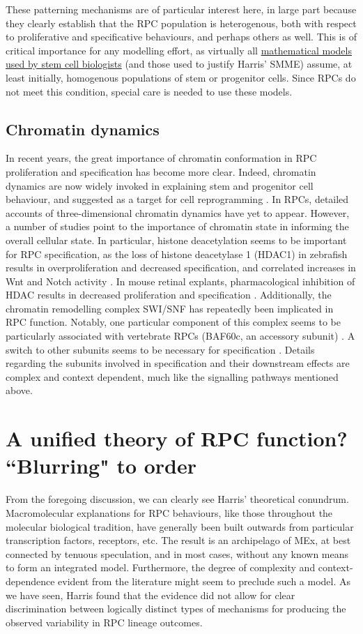 These patterning mechanisms are of particular interest here, in large part because they clearly establish that the RPC population is heterogenous, both with respect to proliferative and specificative behaviours, and perhaps others as well. This is of critical importance for any modelling effort, as virtually all \hyperref[SSM]{mathematical models used by stem cell biologists} (and those used to justify Harris' SMME) assume, at least initially, homogenous populations of stem or progenitor cells. Since RPCs do not meet this condition, special care is needed to use these models.

\subsection{Chromatin dynamics}

In recent years, the great importance of chromatin conformation in RPC proliferation and specification has become more clear. Indeed, chromatin dynamics are now widely invoked in explaining stem and progenitor cell behaviour, and suggested as a target for cell reprogramming \cite{Kondo2006,Tee2014}. In RPCs, detailed accounts of three-dimensional chromatin dynamics have yet to appear. However, a number of studies point to the importance of chromatin state in informing the overall cellular state. In particular, histone deacetylation seems to be important for RPC specification, as the loss of histone deacetylase 1 (HDAC1) in zebrafish results in overproliferation and decreased specification, and correlated increases in Wnt and Notch activity \cite{Yamaguchi2005}. In mouse retinal explants, pharmacological inhibition of HDAC results in decreased proliferation and specification \cite{Chen2007}. Additionally, the chromatin remodelling complex SWI/SNF has repeatedly been implicated in RPC function. Notably, one particular component of this complex seems to be particularly associated with vertebrate RPCs (BAF60c, an accessory subunit) \cite{Lamba2008}. A switch to other subunits seems to be necessary for specification \cite{Lessard2007}. Details regarding the subunits involved in specification and their downstream effects are complex and context dependent, much like the signalling pathways mentioned above.

\section{A unified theory of RPC function? ``Blurring" to order}

From the foregoing discussion, we can clearly see Harris' theoretical conundrum. Macromolecular explanations for RPC behaviours, like those throughout the molecular biological tradition, have generally been built outwards from particular transcription factors, receptors, etc. The result is an archipelago of MEx, at best connected by tenuous speculation, and in most cases, without any known means to form an integrated model. Furthermore, the degree of complexity and context-dependence evident from the literature might seem to preclude such a model. As we have seen, Harris found that the evidence did not allow for clear discrimination between logically distinct types of mechanisms for producing the observed variability in RPC lineage outcomes.

